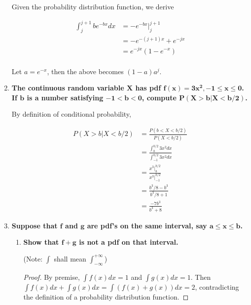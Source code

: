 \documentclass[10pt, oneside]{article}   	%
\theoremstyle{definition}
\begin{document}
\begin{enumerate}[label=4.\arabic*]
Given the probability distribution function, we derive

\begin{align*}
\int^{j+1}_{j} be^{-bx} dx &= -e^{-bx} \Big|^{j+1}_j \\
&= -e^{-(j+1)x} + e^{-jx} \\
&= e^{-jx} (1 - e^{-x} ) \\
\end{align*}

Let $a = e^{-x}$, then the above becomes $(1-a)a^j$.

\item  \begin{tcolorbox}[
  colback=Cerulean!5!white,
  colframe=Cerulean!75!black]
\textbf{The continuous random variable $\bm{X}$ has pdf $\bm{f(x) = 3x^2, -1 \leq x \leq 0}$. If $\bm{b}$ is a number satisfying $\bm{-1 < b < 0}$, compute $\bm{P(X > b | X < b/2)}$.}
\end{tcolorbox}

By definition of conditional probability,

\begin{align*}
P(X > b | X < b/2) &= \frac{P(b < X < b/2)}{P(X < b/2)} \\
&= \frac{\int^{b/2}_b 3x^2 dx}{\int^{b/2}_{-1} 3x^2 dx} \\
&= \frac{x^3 \Big|^{b/2}_b}{x^3 \Big|^{b/2}_{-1}} \\
&= \frac{b^3/8 - b^3}{b^3/8 + 1} \\
&= \boxed{ \frac{-7b^3}{b^3 + 8} }
\end{align*}

\item  \begin{tcolorbox}[
  colback=Cerulean!5!white,
  colframe=Cerulean!75!black]
\textbf{Suppose that $\bm{f}$ and $\bm{g}$ are pdf's on the same interval, say $\bm{a \leq x \leq b}$.}
\end{tcolorbox}

	\begin{enumerate}
	\item  \begin{tcolorbox}[
	  colback=Cerulean!5!white,
	  colframe=Cerulean!75!black]
	\textbf{Show that $\bm{f + g}$ is not a pdf on that interval.}
	\end{tcolorbox}
	
	(Note: $\int$ shall mean $\int^{+\infty}_{-\infty}$)
	
	\begin{proof}
	By premise, $\int f(x) dx = 1$ and $\int g(x) dx = 1$. Then $\int f(x) dx + \int g(x) dx = \int (f(x) + g(x))dx = 2$, contradicting the definition of a probability distribution function. 
	\end{proof}
	

\end{enumerate}
\end{enumerate}
\end{document}
